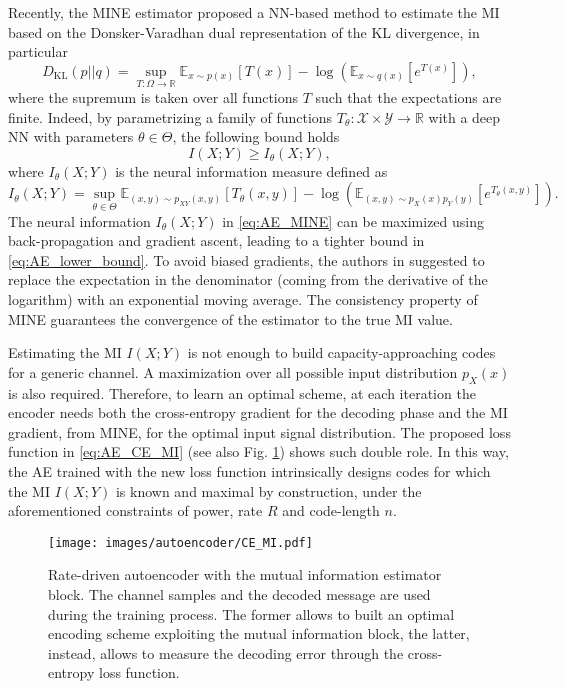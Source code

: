 Recently, the MINE estimator \cite{Mine2018} proposed a NN-based method to estimate the MI based on the Donsker-Varadhan dual representation \cite{Donsker1983} of the KL divergence, in particular 
\begin{equation}
D_{\text{KL}}(p||q) = \sup_{T:\Omega \to \mathbb{R}} \mathbb{E}_{x\sim p(x)}[T(x)]-\log(\mathbb{E}_{x\sim q(x)}[e^{T(x)}]),
\end{equation}
where the supremum is taken over all functions $T$ such that the expectations are finite. Indeed, by parametrizing a family of functions $T_{\theta} : \mathcal{X}\times \mathcal{Y} \to \mathbb{R}$ with a deep NN with parameters $\theta \in \Theta$, the following bound \cite{Mine2018} holds
\begin{equation}
\label{eq:AE_lower_bound}
I(X;Y)\geq I_\theta(X;Y),
\end{equation}
where $I_{\theta}(X;Y)$ is the neural information measure  defined as
\begin{equation}
\label{eq:AE_MINE}
I_\theta(X;Y) = \sup_{\theta \in \Theta} \mathbb{E}_{(x,y)\sim p_{XY}(x,y)}[T_{\theta}(x,y)] -\log(\mathbb{E}_{(x,y)\sim p_X(x) p_Y(y)}[e^{T_{\theta}(x,y)}]).
\end{equation}
The neural information $I_\theta(X;Y)$ in \eqref{eq:AE_MINE} can be maximized using back-propagation and gradient ascent, leading to a tighter bound in \eqref{eq:AE_lower_bound}. To avoid biased gradients, the authors in \cite{Mine2018} suggested to replace the expectation in the denominator (coming from the derivative of the logarithm) with an exponential moving average. The consistency property of MINE guarantees the convergence of the estimator to the true MI value.

Estimating the MI $I(X;Y)$ is not enough to build capacity-approaching codes for a generic channel. A maximization over all possible input distribution $p_X(x)$ is also required. Therefore, to learn an optimal scheme, at each iteration the encoder needs both the cross-entropy gradient for the decoding phase and the MI gradient, from MINE, for the optimal input signal distribution. 
The proposed loss function in \eqref{eq:AE_CE_MI} (see also Fig. \ref{fig:AE_CE_MI}) shows such double role. In this way, the AE trained with the new loss function intrinsically designs codes for which the MI $I(X;Y)$ is known and maximal by construction, under the aforementioned constraints of power, rate $R$ and code-length $n$.

\begin{figure}
	\centering
	\texttt{[image: images/autoencoder/CE\_MI.pdf]}
	\caption{Rate-driven autoencoder with the mutual information estimator block. The channel samples and the decoded message are used during the training process. The former allows to built an optimal encoding scheme exploiting the mutual information block, the latter, instead, allows to measure the decoding error through the cross-entropy loss function.}
	\label{fig:AE_CE_MI}
\end{figure} 


